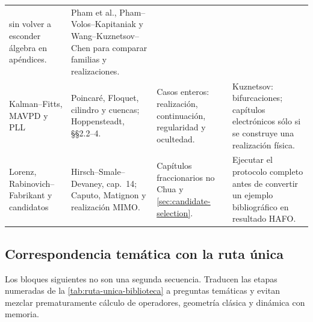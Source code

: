 \begin{longtable}{@{}L{3.1cm}L{4.0cm}L{4.1cm}L{3.0cm}@{}}
sin volver a esconder álgebra en apéndices. &
Pham et al., Pham--Volos--Kapitaniak y Wang--Kuznetsov--Chen para comparar
familias y realizaciones. \\
Kalman--Fitts, MAVPD y PLL &
Poincaré, Floquet, cilindro y cuencas; Hoppensteadt, \S\S2.2--4. &
Casos enteros: realización, continuación, regularidad y ocultedad. &
Kuznetsov: bifurcaciones; capítulos electrónicos sólo si se construye una
realización física. \\
Lorenz, Rabinovich--Fabrikant y candidatos &
Hirsch--Smale--Devaney, cap.\ 14; Caputo, Matignon y realización MIMO. &
Capítulos fraccionarios no Chua y \cref{sec:candidate-selection}. &
Ejecutar el protocolo completo antes de convertir un ejemplo bibliográfico en
resultado HAFO. \\
\bottomrule
\end{longtable}

\subsection{Correspondencia temática con la ruta única}

Los bloques siguientes no son una segunda secuencia. Traducen las etapas
numeradas de la \cref{tab:ruta-unica-biblioteca} a preguntas temáticas y
evitan mezclar prematuramente cálculo de operadores, geometría clásica y
dinámica con memoria.

